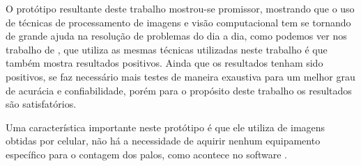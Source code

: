 O protótipo resultante deste trabalho  mostrou-se promissor, mostrando que o uso de técnicas de processamento de imagens e visão computacional tem se tornando de grande ajuda na resolução de problemas do dia a dia, como podemos ver nos trabalho de \cite{SILVA2012},  que utiliza as mesmas técnicas utilizadas neste trabalho é que também mostra resultados positivos. Ainda que os resultados tenham sido positivos,  se faz necessário mais testes de maneira exaustiva para um melhor grau de acurácia e confiabilidade, porém para o propósito deste trabalho os resultados são satisfatórios.

Uma característica importante neste protótipo é que ele utiliza de imagens obtidas por celular, não há a necessidade de aquirir nenhum equipamento específico para o contagem dos palos, como acontece no software \cite{skip2018}.








